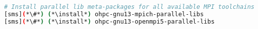 
\begin{lstlisting}[language=bash,keywords={},upquote=true,keepspaces]
# Install parallel lib meta-packages for all available MPI toolchains
[sms](*\#*) (*\install*) ohpc-gnu13-mpich-parallel-libs
[sms](*\#*) (*\install*) ohpc-gnu13-openmpi5-parallel-libs
\end{lstlisting}
